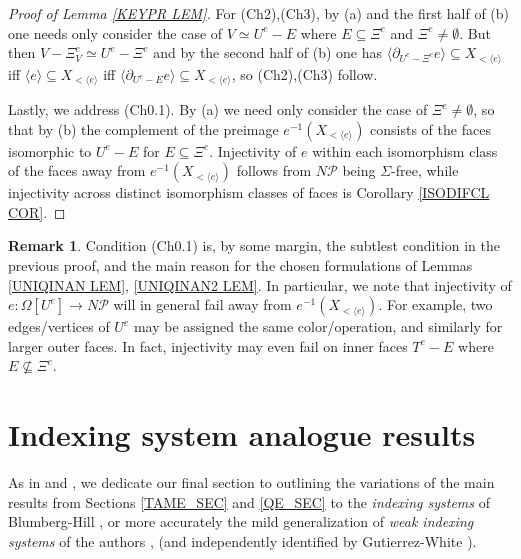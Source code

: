 \documentclass[a4paper,10pt]{article}%
\numberwithin{equation}{section}
\numberwithin{figure}{section}
\theoremstyle{definition} %
\newtheorem{remark}[equation]{Remark}%
\newcommand{\1}{\ensuremath{\mathbbm 1}}%
\begin{document}
\begin{proof}[Proof of Lemma \ref{KEYPR LEM}]
	For (Ch2),(Ch3), by (a) and the first half of (b) one needs only consider the case of
	$V \simeq U^e - E$ where $E \subseteq \Xi^e$ and $\Xi^e \neq \emptyset$.
	But then
	$V - \Xi^e_V \simeq U^e- \Xi^e$
	and by the second half of (b)
	one has
	$\langle \partial_{U^e-\Xi^e}e \rangle \subseteq  X_{<\langle e\rangle}$
	iff
	$\langle e \rangle \subseteq  X_{<\langle e\rangle}$
	iff
	$\langle \partial_{U^e-E}e \rangle \subseteq  X_{<\langle e\rangle}$,
	so (Ch2),(Ch3) follow.
	
	
	Lastly, we address (Ch0.1). By (a) we need only consider the case of $\Xi^e \neq \emptyset$,
	so that by (b)
	the complement of
	the preimage
	$e^{-1}(X_{<\langle e\rangle})$
	consists of the faces isomorphic to
	$U^e-E$ for $E \subseteq \Xi^e$.
	Injectivity of $e$ within each isomorphism class of the faces away from %
	$e^{-1}(X_{<\langle e\rangle})$
	follows from $N \mathcal{P}$ being $\Sigma$-free,
	while injectivity across distinct isomorphism classes of faces is
	Corollary \ref{ISODIFCL COR}.
\end{proof}



\begin{remark}
	Condition (Ch0.1) is, by some margin, the subtlest condition in the previous proof, and the main reason for the chosen formulations of 
	Lemmas \ref{UNIQINAN LEM}, \ref{UNIQINAN2 LEM}.
	In particular, we note that injectivity of 
	$e \colon \Omega[U^e] \to N \mathcal{P}$ will in general fail away from 
	$e^{-1}(X_{< \langle e \rangle})$.
	For example, two edges/vertices of $U^e$
	may be assigned the same color/operation, and similarly for larger outer faces. In fact, injectivity may even fail on inner faces
	$T^e-E$ where $E \not \subseteq \Xi^e$.
\end{remark}









\iffalse




\section{Indexing system analogue results}\label{INDSYS SEC}

As in \cite[\S 6]{BP_edss} and \cite[\S 9]{Per18}, we dedicate our final section to 
outlining the variations of the main results from Sections \ref{TAME_SEC} and \ref{QE_SEC} to
the \textit{indexing systems} of Blumberg-Hill \cite{BH15}, or more accurately
the mild generalization of \textit{weak indexing systems} of the authors \cite[\S 9]{Per18}, \cite[\S4.4]{BP_geo} (and independently identified by Gutierrez-White \cite{GW18}).
\end{document}
